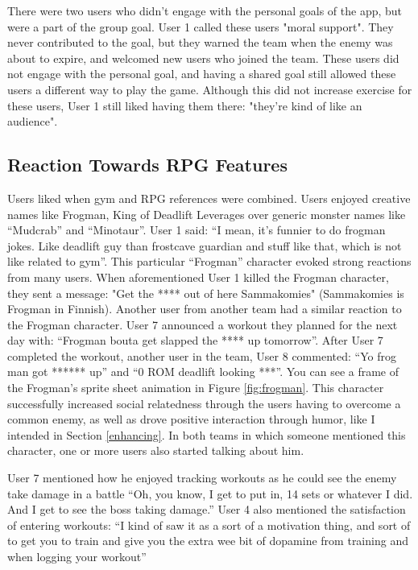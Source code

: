 \documentclass{l4proj}
\begin{document}
There were two users who didn't engage with the personal goals of the app, but were a part of the group goal. User 1 called these users "moral support". They never contributed to the goal, but they warned the team when the enemy was about to expire, and welcomed new users who joined the team. These users did not engage with the personal goal, and having a shared goal still allowed these users a different way to play the game. Although this did not increase exercise for these users, User 1 still liked having them there: "they're kind of like an audience". 

\subsection{Reaction Towards RPG Features}
Users liked when gym and RPG references were combined. Users enjoyed creative names like Frogman, King of Deadlift Leverages over generic monster names like ``Mudcrab'' and ``Minotaur''. User 1 said: ``I mean, it's funnier to do frogman jokes. Like deadlift guy than frostcave guardian and stuff like that, which is not like related to gym''. This particular ``Frogman'' character evoked strong reactions from many users. When aforementioned User 1 killed the Frogman character, they sent a message: "Get the **** out of here Sammakomies" (Sammakomies is Frogman in Finnish). Another user from another team had a similar reaction to the Frogman character. User 7 announced a workout they planned for the next day with: ``Frogman bouta get slapped the **** up tomorrow''. After User 7 completed the workout, another user in the team, User 8 commented: ``Yo frog man got ****** up'' and ``0 ROM deadlift looking ***''.  You can see a frame of the Frogman's sprite sheet animation in Figure \ref{fig:frogman}. This character successfully increased social relatedness through the users having to overcome a common enemy, as well as drove positive interaction through humor, like I intended in Section \ref{enhancing}. In both teams in which someone mentioned this character, one or more users also started talking about him.

User 7 mentioned how he enjoyed tracking workouts as he could see the enemy take damage in a battle ``Oh, you know, I get to put in, 14 sets or whatever I did. And I get to see the boss taking damage.'' User 4 also mentioned the satisfaction of entering workouts: ``I kind of saw it as a sort of a motivation thing, and sort of to get you to train and give you the extra wee bit of dopamine from training and when logging your workout''
\end{document}
